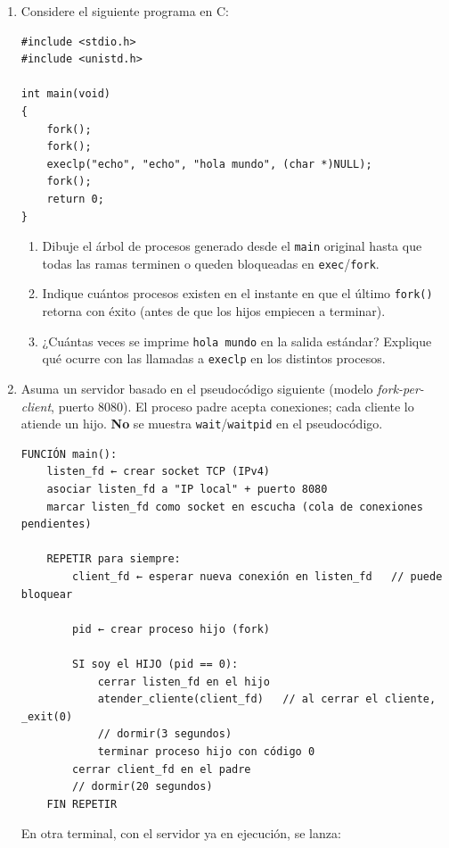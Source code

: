 \documentclass[11pt,a4paper]{article}
\begin{document}
\begin{enumerate}[label=\textbf{\arabic*.}, leftmargin=*]
\item Considere el siguiente programa en C:

\begin{lstlisting}[style=ccode]
#include <stdio.h>
#include <unistd.h>

int main(void)
{
    fork();
    fork();
    execlp("echo", "echo", "hola mundo", (char *)NULL);
    fork();
    return 0;
}
\end{lstlisting}

\begin{enumerate}[label=(\alph*), leftmargin=2em]
  \item Dibuje el árbol de procesos generado desde el \texttt{main} original hasta que todas las ramas terminen o queden bloqueadas en \texttt{exec}/\texttt{fork}.
  \item Indique cuántos procesos existen en el instante en que el último \texttt{fork()} retorna con éxito (antes de que los hijos empiecen a terminar).
  \item ¿Cuántas veces se imprime \texttt{hola mundo} en la salida estándar? Explique qué ocurre con las llamadas a \texttt{execlp} en los distintos procesos.
\end{enumerate}

\item Asuma un servidor basado en el pseudocódigo siguiente (modelo \emph{fork-per-client}, puerto 8080). El proceso padre acepta conexiones; cada cliente lo atiende un hijo. \textbf{No} se muestra \texttt{wait}/\texttt{waitpid} en el pseudocódigo.

\begin{lstlisting}[style=pseudocode]
FUNCIÓN main():
    listen_fd ← crear socket TCP (IPv4)
    asociar listen_fd a "IP local" + puerto 8080
    marcar listen_fd como socket en escucha (cola de conexiones pendientes)

    REPETIR para siempre:
        client_fd ← esperar nueva conexión en listen_fd   // puede bloquear

        pid ← crear proceso hijo (fork)

        SI soy el HIJO (pid == 0):
            cerrar listen_fd en el hijo
            atender_cliente(client_fd)   // al cerrar el cliente, _exit(0)
            // dormir(3 segundos)
            terminar proceso hijo con código 0
        cerrar client_fd en el padre
        // dormir(20 segundos)
    FIN REPETIR
\end{lstlisting}

\noindent En otra terminal, con el servidor ya en ejecución, se lanza:


\end{enumerate}
\end{document}
